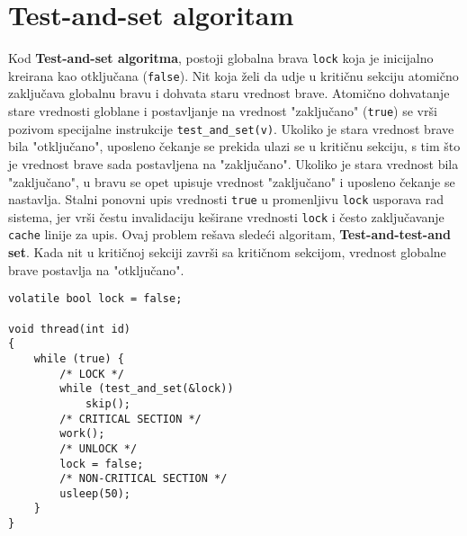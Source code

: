 \clearpage
\section{Test-and-set algoritam}
Kod \textbf{Test-and-set algoritma}, postoji globalna brava \texttt{lock} koja je inicijalno kreirana kao otklju\v{c}ana (\texttt{false}). Nit koja \v{z}eli da udje u kriti\v{c}nu sekciju atomi\v{c}no zaklju\v{c}ava globalnu bravu i dohvata staru vrednost brave. Atomi\v{c}no dohvatanje stare vrednosti globlane i postavljanje na vrednost "zaklju\v{c}ano" (\texttt{true}) se vr\v{s}i pozivom specijalne instrukcije \texttt{test\_and\_set(v)}. Ukoliko je stara vrednost brave bila "otklju\v{c}ano", uposleno \v{c}ekanje se prekida ulazi se u kriti\v{c}nu sekciju, s tim \v{s}to je vrednost brave sada postavljena na "zaklju\v{c}ano". Ukoliko je stara vrednost bila "zaklju\v{c}ano", u bravu se opet upisuje vrednost "zaklju\v{c}ano" i uposleno \v{c}ekanje se nastavlja. Stalni ponovni upis vrednosti \texttt{true} u promenljivu \texttt{lock} usporava rad sistema, jer vr\v{s}i \v{c}estu invalidaciju ke\v{s}irane vrednosti \texttt{lock} i \v{c}esto zaklju\v{c}avanje \texttt{cache} linije za upis. Ovaj problem re\v{s}ava slede\'{c}i algoritam, \textbf{Test-and-test-and set}. Kada nit u kriti\v{c}noj sekciji zavr\v{s}i sa kriti\v{c}nom sekcijom, vrednost globalne brave postavlja na "otklju\v{c}ano".
\begin{lstlisting}
volatile bool lock = false;

void thread(int id)
{
    while (true) {
		/* LOCK */
        while (test_and_set(&lock))
            skip();
		/* CRITICAL SECTION */
		work();
		/* UNLOCK */
		lock = false;
		/* NON-CRITICAL SECTION */
        usleep(50);
    }
}
\end{lstlisting}